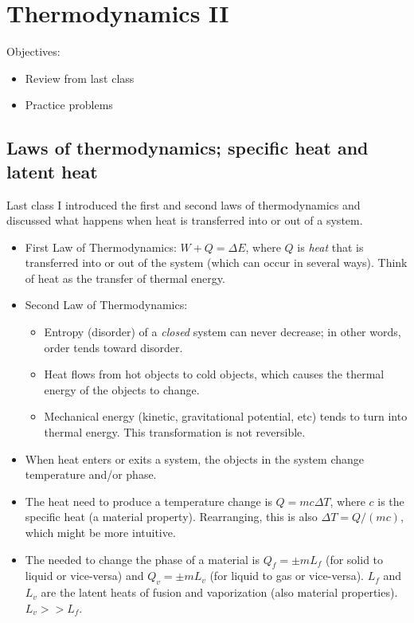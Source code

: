 \section{Thermodynamics II}
Objectives:
\begin{itemize}
\item Review from last class
\item Practice problems
\end{itemize}

\subsection{Laws of thermodynamics; specific heat and latent heat}
Last class I introduced the first and second laws of thermodynamics and discussed what happens when heat is transferred into or out of a system.
\begin{itemize}
\item First Law of Thermodynamics: $W+Q=\Delta{E}$, where $Q$ is \textit{heat} that is transferred into or out of the system (which can occur in several ways). Think of heat as the transfer of thermal energy.
\item Second Law of Thermodynamics: 
	\begin{itemize}
	\item Entropy (disorder) of a \textit{closed} system can never decrease; in other words, order tends toward disorder.
	\item Heat flows from hot objects to cold objects, which causes the thermal energy of the objects to change.
	\item Mechanical energy (kinetic, gravitational potential, etc) tends to turn into thermal energy. This transformation is not reversible.
	\end{itemize}
\item When heat enters or exits a system, the objects in the system change temperature and/or phase.
\item The heat need to produce a temperature change is $Q=mc\Delta{T}$, where $c$ is the specific heat (a material property). Rearranging, this is also $\Delta{T}=Q/(mc)$, which might be more intuitive.
\item The needed to change the phase of a material is $Q_f=\pm mL_f$ (for solid to liquid or vice-versa) and $Q_v=\pm mL_v$ (for liquid to gas or vice-versa). $L_f$ and $L_v$ are the latent heats of fusion and vaporization (also material properties). $L_v>>L_f$.
\end{itemize}

